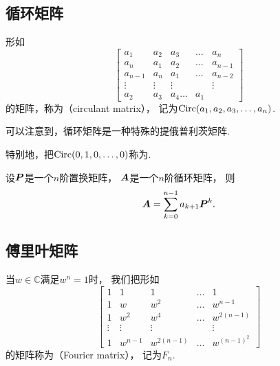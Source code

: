 \subsection{循环矩阵}
形如\begin{equation*}
	\begin{bmatrix}
		a_1 & a_2 & a_3 & \dots & a_n \\
		a_n & a_1 & a_2 & \dots & a_{n-1} \\
		a_{n-1} & a_n & a_1 & \dots & a_{n-2} \\
		\vdots & \vdots & \vdots & & \vdots \\
		a_2 & a_3 & a_4 \dots & a_1
	\end{bmatrix}
\end{equation*}
的矩阵，称为（circulant matrix），
记为\(\operatorname{Circ}(a_1,a_2,a_3,\dotsc,a_n)\).


可以注意到，循环矩阵是一种特殊的提俄普利茨矩阵.

特别地，把\(\operatorname{Circ}(0,1,0,\dotsc,0)\)称为.

\begin{proposition}
设\(\boldsymbol{P}\)是一个\(n\)阶置换矩阵，
\(\boldsymbol{A}\)是一个\(n\)阶循环矩阵，
则\begin{equation*}
	\boldsymbol{A} = \sum_{k=0}^{n-1} a_{k+1} \boldsymbol{P}^k.
\end{equation*}
\end{proposition}

\subsection{傅里叶矩阵}
当\(w \in \mathbb{C}\)满足\(w^n = 1\)时，
我们把形如\begin{equation*}
	\begin{bmatrix}
		1 & 1 & 1 & \dots & 1 \\
		1 & w & w^2 & \dots & w^{n-1} \\
		1 & w^2 & w^4 & \dots & w^{2(n-1)} \\
		\vdots & \vdots & \vdots & & \vdots \\
		1 & w^{n-1} & w^{2(n-1)} & \dots & w^{(n-1)^2}
	\end{bmatrix}
\end{equation*}
的矩阵称为（Fourier matrix），
记为\(F_n\).
